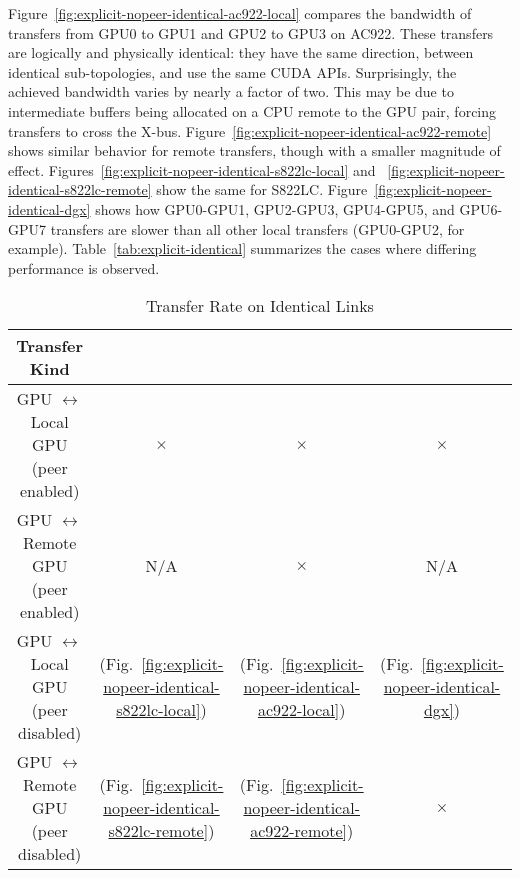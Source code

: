 Figure~\ref{fig:explicit-nopeer-identical-ac922-local} compares the bandwidth of transfers from GPU0 to GPU1 and GPU2 to GPU3 on AC922.
These transfers are logically and physically identical: they have the same direction, between identical sub-topologies, and use the same CUDA APIs.
Surprisingly, the achieved bandwidth varies by nearly a factor of two.
This may be due to intermediate buffers being allocated on a CPU remote to the GPU pair, forcing transfers to cross the X-bus.
Figure~\ref{fig:explicit-nopeer-identical-ac922-remote} shows similar behavior for remote transfers, though with a smaller magnitude of effect.
Figures~\ref{fig:explicit-nopeer-identical-s822lc-local} and ~\ref{fig:explicit-nopeer-identical-s822lc-remote} show the same for S822LC.
Figure~\ref{fig:explicit-nopeer-identical-dgx} shows how GPU0-GPU1, GPU2-GPU3, GPU4-GPU5, and GPU6-GPU7 transfers are slower than all other local transfers (GPU0-GPU2, for example).
Table~\ref{tab:explicit-identical} summarizes the cases where differing performance is observed.

\begin{table}[ht]
	\centering
	\caption[Transfer rate on Identical Links]{Transfer Rate on Identical Links}
	\label{tab:explicit}
	\begin{tabular}{cccc}
		\hline
		\textbf{Transfer Kind}                      \\ \hline 
		\makecell{ GPU $\leftrightarrow$ Local GPU  \\ (peer enabled)  } & $\times$                                                            & $\times$                                                           & $\times$                                                  \\ \hline
		\makecell{ GPU $\leftrightarrow$ Remote GPU \\ (peer enabled)  } & N/A                                                                 & $\times$                                                           & N/A                                                       \\ \hline
		\makecell{ GPU $\leftrightarrow$ Local GPU  \\ (peer disabled) } & \checkmark (Fig.~\ref{fig:explicit-nopeer-identical-s822lc-local})  & \checkmark (Fig.~\ref{fig:explicit-nopeer-identical-ac922-local})  & \checkmark (Fig.~\ref{fig:explicit-nopeer-identical-dgx}) \\ \hline
		\makecell{ GPU $\leftrightarrow$ Remote GPU \\ (peer disabled) } & \checkmark (Fig.~\ref{fig:explicit-nopeer-identical-s822lc-remote}) & \checkmark (Fig.~\ref{fig:explicit-nopeer-identical-ac922-remote}) & $\times$                                                  \\ \hline
	\end{tabular}
\end{table}

